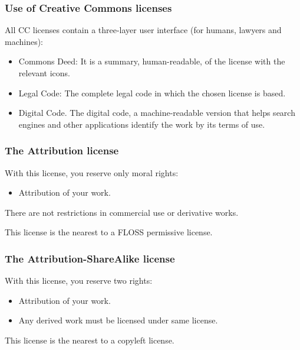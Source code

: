 \documentclass{beamer}
\begin{document}
\begin{frame}
\frametitle{Use of Creative Commons licenses}

All CC licenses contain a \alert{three-layer user interface} (for humans, lawyers and machines):
\begin{itemize}
\item \alert{Commons Deed:} It is a summary, human-readable, of the license with the relevant icons.
\item \alert{Legal Code:} The complete legal code in which the chosen license is based.
\item \alert{Digital Code.} The digital code, a machine-readable version that helps search engines and other applications identify the work by its terms of use.
\end{itemize}                                                 

\end{frame}


\begin{frame}
\frametitle{The Attribution license}

With this license, you reserve only moral rights:

\begin{itemize}
\item Attribution of your work.
\end{itemize}

There are not restrictions in commercial use or derivative works.

This license is the nearest to a FLOSS permissive license. 

\end{frame}



\begin{frame}
\frametitle{The Attribution-ShareAlike license}

With this license, you reserve two rights:

\begin{itemize}
\item Attribution of your work.
\item Any derived work must be licensed under same license.
\end{itemize}

This license is the nearest to a copyleft license. 

\end{frame}
\end{document}
